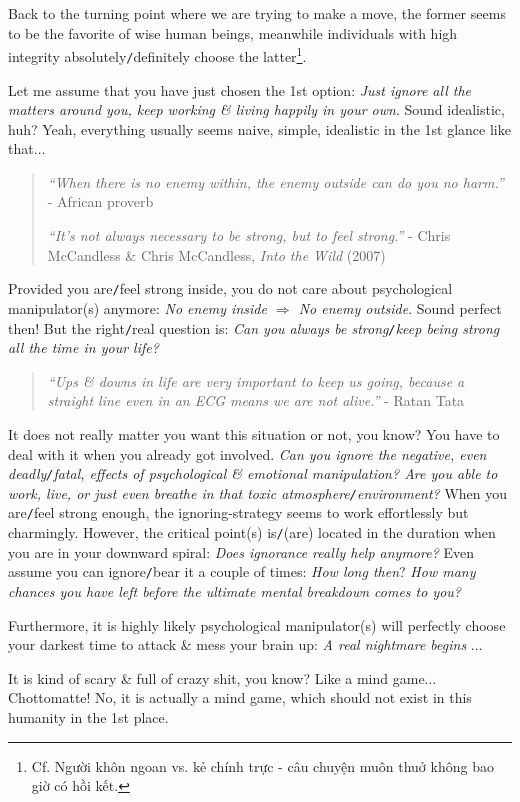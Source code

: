 \documentclass[12pt,oneside]{book}
\begin{document}
Back to the turning point where we are trying to make a move, the former seems to be the favorite of wise human beings, meanwhile individuals with high integrity absolutely{\tt/}definitely choose the latter\footnote{Cf. Người khôn ngoan vs. kẻ chính trực - câu chuyện muôn thuở không bao giờ có hồi kết.}.

Let me assume that you have just chosen the 1st option: {\it Just ignore all the matters around you, keep working \& living happily in your own}. Sound idealistic, huh? Yeah, everything usually seems naive, simple, idealistic in the 1st glance like that$\ldots$
\begin{quotation}
	{\it``When there is no enemy within, the enemy outside can do you no harm.''} - African proverb
	
	{\it``It's not always necessary to be strong, but to feel strong.''} - {\sc Chris McCandless} \& {\sf Chris McCandless}, {\it Into the Wild} (2007)
\end{quotation}
Provided you are{\tt/}feel strong inside, you do not care about psychological manipulator(s) anymore: {\it No enemy inside $\Rightarrow$ No enemy outside}. Sound perfect then! But the right{\tt/}real question is: {\it Can you always be strong{\tt/}keep being strong all the time in your life?}
\begin{quotation}
	{\it``Ups \& downs in life are very important to keep us going, because a straight line even in an ECG means we are not alive.''} - {\sc Ratan Tata}
\end{quotation}
It does not really matter you want this situation or not, you know? You have to deal with it when you already got involved. {\it Can you ignore the negative, even deadly{\tt/}fatal, effects of psychological \& emotional manipulation? Are you able to work, live, or just even breathe in that toxic atmosphere{\tt/}environment?} When you are{\tt/}feel strong enough, the ignoring-strategy seems to work effortlessly but charmingly. However, the critical point(s) is{\tt/}(are) located in the duration when you are in your downward spiral: {\it Does ignorance really help anymore?} Even assume you can ignore{\tt/}bear it a couple of times: {\it How long then}? {\it How many chances you have left before the ultimate mental breakdown comes to you?}

Furthermore, it is highly likely psychological manipulator(s) will perfectly choose your darkest time to attack \& mess your brain up: {\it A real nightmare begins} $\ldots$

It is kind of scary \& full of crazy shit, you know? Like a mind game$\ldots$ Chottomatte! No, it is actually a mind game, which should not exist in this humanity in the 1st place.
\end{document}
